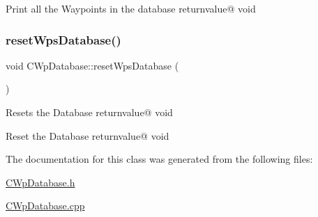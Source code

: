 Print all the Waypoints in the database returnvalue@ void \mbox{\label{classCWpDatabase_a13e513a40e9339ae56f1c8b77eb0b9d3}} 
\subsubsection{\texorpdfstring{reset\+Wps\+Database()}{resetWpsDatabase()}}
{\footnotesize\ttfamily void C\+Wp\+Database\+::reset\+Wps\+Database (\begin{DoxyParamCaption}{ }\end{DoxyParamCaption})}

Resets the Database returnvalue@ void

Reset the Database returnvalue@ void 

The documentation for this class was generated from the following files\+:\begin{DoxyCompactItemize}
\item 
\hyperlink{CWpDatabase_8h}{C\+Wp\+Database.\+h}\item 
\hyperlink{CWpDatabase_8cpp}{C\+Wp\+Database.\+cpp}\end{DoxyCompactItemize}
